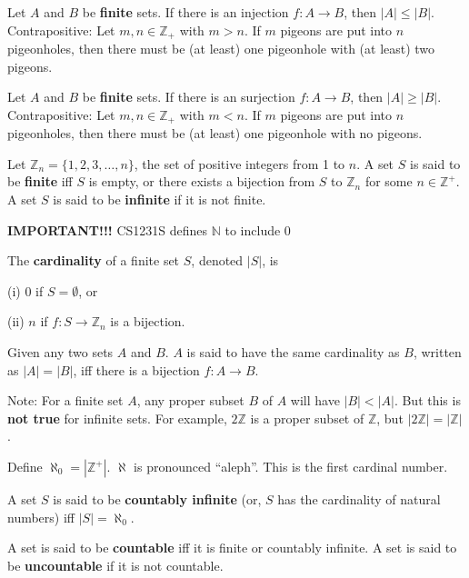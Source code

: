 \documentclass{article}
\begin{document}
\begin{description}
	\vspace{0.2cm}
    \item[\large Cardinality]
    \item[Pigeonhole Principle]Let $A$ and $B$ be \textbf{finite} sets. If there is an injection $f:A\to B$, then $|A| \leq |B|$. Contrapositive: Let $m, n\in\mathbb{Z}_{+}$ with $m > n$. If $m$ pigeons are put into $n$ pigeonholes, then there must be (at least) one pigeonhole with (at least) two pigeons.
    \item[Dual Pigeonhole Principles]Let $A$ and $B$ be \textbf{finite} sets. If there is an surjection $f:A\to B$, then $|A| \geq |B|$. Contrapositive: Let $m, n\in\mathbb{Z}_{+}$ with $m < n$. If $m$ pigeons are put into $n$ pigeonholes, then there must be (at least) one pigeonhole with no pigeons.
    \item[Finite set and Infinite set]Let $\mathbb{Z}_{n} = \{1,2,3,\dots,n\}$, the set of positive integers from 1 to $n$. A set $S$ is said to be \textbf{finite} iff $S$ is empty, or there exists a bijection from $S$ to $\mathbb{Z}_{n}$ for some $n\in\mathbb{Z}^{+}$. A set $S$ is said to be \textbf{infinite} if it is not finite.
    \item \qquad \textbf{IMPORTANT!!!} CS1231S defines $\mathbb{N}$ to include 0
    \item[Cardinality]The \textbf{cardinality} of a finite set $S$, denoted $|S|$, is 
    \item \qquad \;(i) 0 if $S=\emptyset$, or 
    \item \qquad (ii) $n$ if $f:S\to \mathbb{Z}_{n}$ is a bijection.
    \item[Same Cardinality (Cantor)] Given any two sets $A$ and $B$. $A$ is said to have the same cardinality as $B$, written as $|A| = |B|$, iff there is a bijection $f:A\to B$.
	\item \qquad Note: For a finite set $A$, any proper subset $B$ of $A$ will have $|B|<|A|$. But this is \textbf{not true} for infinite sets. For example, $2\mathbb{Z}$ is a proper subset of $\mathbb{Z}$, but $|2\mathbb{Z}|=|\mathbb{Z}|$.
	\item[Cardinal Numbers] Define $\aleph_{0}=|\mathbb{Z}^{+}|$. $\aleph$ is pronounced ``aleph''. This is the first cardinal number.
	\item[Countably Infinite]A set $S$ is said to be \textbf{countably infinite} (or, $S$ has the cardinality of natural numbers) iff $|S|=\aleph_{0}$.
	\item[Countable set and Uncountable Set]A set is said to be \textbf{countable} iff it is finite or countably infinite. A set is said to be \textbf{uncountable} if it is not countable.

\end{description}
\end{document}
